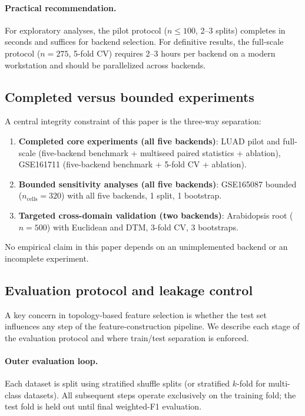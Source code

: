 \documentclass[11pt]{article}
\begin{document}
\paragraph{Practical recommendation.}
For exploratory analyses, the pilot protocol ($n \leq 100$, 2--3 splits) completes in seconds and suffices for backend selection.
For definitive results, the full-scale protocol ($n = 275$, 5-fold CV) requires 2--3 hours per backend on a modern workstation and should be parallelized across backends.

\subsection{Completed versus bounded experiments}

A central integrity constraint of this paper is the three-way separation:
\begin{enumerate}[leftmargin=1.5em]
\item \textbf{Completed core experiments (all five backends)}: LUAD pilot and full-scale (five-backend benchmark + multiseed paired statistics + ablation), GSE161711 (five-backend benchmark + 5-fold CV + ablation).
\item \textbf{Bounded sensitivity analyses (all five backends)}: GSE165087 bounded ($n_{\text{cells}} = 320$) with all five backends, 1 split, 1 bootstrap.
\item \textbf{Targeted cross-domain validation (two backends)}: Arabidopsis root ($n = 500$) with Euclidean and DTM, 3-fold CV, 3 bootstraps.
\end{enumerate}
No empirical claim in this paper depends on an unimplemented backend or an incomplete experiment.

\subsection{Evaluation protocol and leakage control}
\label{sec:leakage}

A key concern in topology-based feature selection is whether the test set influences any step of the feature-construction pipeline.
We describe each stage of the evaluation protocol and where train/test separation is enforced.

\paragraph{Outer evaluation loop.}
Each dataset is split using stratified shuffle splits (or stratified $k$-fold for multi-class datasets).
All subsequent steps operate exclusively on the training fold; the test fold is held out until final weighted-F1 evaluation.
\end{document}
